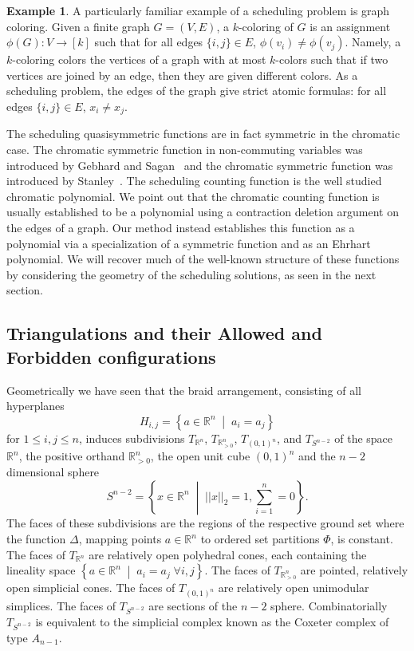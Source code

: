 \documentclass[12pt,reqno]{amsart}
\numberwithin{definition}{section}
\theoremstyle{definition}
\newtheorem{example}[definition]{Example}
\newcommand{\RR}{\mathbb{R}}
\newcommand{\SSS}{\mathcal{S}}
\newcommand{\mset}[2]{ \left\{ #1 \; \middle| \; #2 \right\}}
\newcommand{\T}{T} %
\newcommand{\TRn}{\T_{\RR^n}} %
\newcommand{\TS}{\T_{S^{n-2}}} %
\newcommand{\TP}{\T_{\RR^n_{> 0}}} %
\newcommand{\TC}{\T_{(0,1)^n}} %
\newcommand{\poly}{\chi} %
\begin{document}
\begin{example}
A particularly familiar example of a scheduling problem is graph
coloring.  Given a finite graph $G = (V,E)$, a $k$-coloring of $G$ is
an assignment $\phi(G): V \rightarrow [k]$ such that for all edges
$\{i,j\} \in E$, $\phi(v_i) \neq \phi(v_j)$.  Namely, a
$k$-coloring colors the vertices of a graph with at most $k$-colors
such that if two vertices are joined by an edge, then they are given
different colors.  As a scheduling problem, the edges of the graph
give strict atomic formulas: for all edges $\{i,j\} \in E$, $x_i
\neq x_j$.  

The scheduling quasisymmetric functions are in fact symmetric in the
chromatic case.  The chromatic symmetric function in non-commuting
variables was introduced by Gebhard and Sagan~\cite{GS} and the
chromatic symmetric function was introduced by
Stanley~\cite{stan-chromatic}.  The scheduling counting function is
the well studied chromatic polynomial.  We point out that the
chromatic counting function is usually established to be a polynomial
using a contraction deletion argument on the edges of a graph.  Our
method instead establishes this function as a polynomial via a
specialization of a symmetric function and as an Ehrhart polynomial.  We will recover much of the well-known structure of these functions by considering the geometry of the scheduling solutions, as seen in the next section.

\end{example}


\subsection{Triangulations and their Allowed and Forbidden configurations}
\label{sec:allow-forb-configurations}
Geometrically we have seen that
the braid arrangement, consisting of all hyperplanes
\[
  H_{i,j} = \mset{a\in\RR^n}{a_i = a_j}
\]
for $1\leq i,j\leq n$, induces subdivisions $\TRn$, $\TP$, $\TC$, and $\TS$ of the space $\RR^n$, the positive orthand $\RR^n_{> 0}$, the open unit cube $(0,1)^n$ and the $n-2$ dimensional sphere
\[
S^{n-2}=\mset{x\in\RR^n}{||x||_2 = 1, \sum_{i=1}^n = 0}.
\]
 The faces of these subdivisions are the regions of the respective ground set where the function $\Delta$, mapping points $a\in\RR^n$ to ordered set partitions $\Phi$, is constant. The faces of $\TRn$ are relatively open polyhedral cones, each containing the lineality space $\mset{a\in\RR^n}{a_i=a_j \; \forall i,j}$. The faces of $\TP$ are pointed, relatively open simplicial cones. The faces of $\TC$ are relatively open unimodular simplices. The faces of $\TS$ are sections of the $n-2$ sphere. Combinatorially $\TS$ is equivalent to the simplicial complex known as the Coxeter complex of type $A_{n-1}$.
\end{document}

